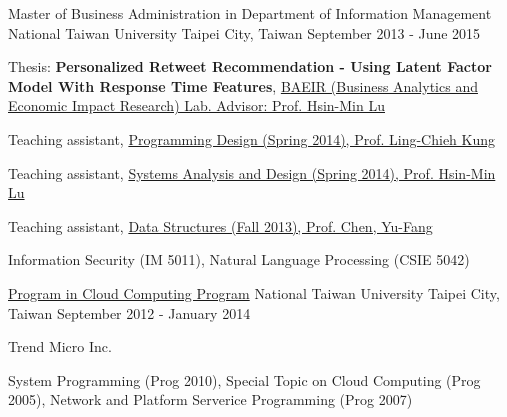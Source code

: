 

\begin{cventries}

  \cventry
    {Master of Business Administration in Department of Information Management} %
    {National Taiwan University} %
    {Taipei City, Taiwan} %
    {September 2013 - June 2015} %
    {
      \begin{cvitems} %
        \item {Thesis: \textbf{Personalized Retweet Recommendation - Using Latent Factor Model With Response Time Features}, \href{http://im.ntu.edu.tw/~lu/research_dir.htm}{BAEIR (Business Analytics and Economic Impact Research) Lab. Advisor: Prof. Hsin-Min Lu}}
        \item {Teaching assistant, \href{http://www.im.ntu.edu.tw/~lckung/courses/old/PD14/}{Programming Design (Spring 2014), Prof. Ling-Chieh Kung}}
        \item {Teaching assistant, \href{https://nol.ntu.edu.tw/nol/coursesearch/print_table.php?course_id=705\%2031200&class=&dpt_code=7050&ser_no=63330&semester=102-2&lang=CH}{Systems Analysis and Design (Spring 2014), Prof. Hsin-Min Lu}}
        \item {Teaching assistant, \href{https://nol.ntu.edu.tw/nol/coursesearch/print_table.php?course_id=705\%2021200&class=&dpt_code=7050&ser_no=71181&semester=102-1&lang=CH}{Data Structures (Fall 2013), Prof. Chen, Yu-Fang}}
        \item {Information Security (IM 5011), Natural Language Processing (CSIE 5042)}
      \end{cvitems}
    }

  \cventry
    {\href{https://www.csie.ntu.edu.tw/cloud/}{Program in Cloud Computing Program}} %
    {National Taiwan University} %
    {Taipei City, Taiwan} %
    {September 2012 - January 2014} %
    {
      \begin{cvitems} %
        \item {Trend Micro Inc.}
        \item {System Programming (Prog 2010), Special Topic on Cloud Computing (Prog 2005), Network and Platform Serverice Programming (Prog 2007)}
      \end{cvitems}
    }


\end{cventries}
